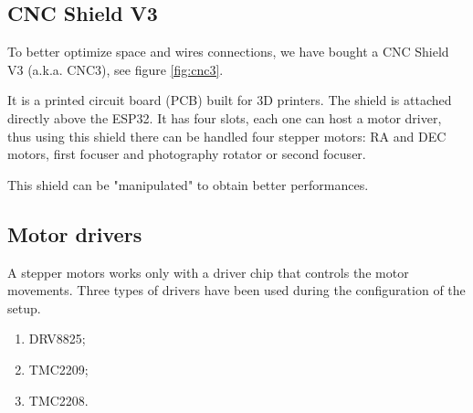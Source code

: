 
\subsection{CNC Shield V3}
To better optimize space and wires connections, we have bought a CNC Shield V3 (a.k.a. CNC3), see figure \ref{fig:cnc3}.

It is a printed circuit board (PCB) built for 3D printers.
The shield is attached directly above the ESP32.
It has four slots, each one can host a motor driver, thus using this shield there can be handled four stepper motors: RA and DEC motors, first focuser and photography rotator or second focuser.

This shield can be "manipulated" to obtain better performances.

\subsection{Motor drivers}
A stepper motors works only with a driver chip that controls the motor movements.
Three types of drivers have been used during the configuration of the setup.
\begin{enumerate}
    \item DRV8825;
    \item TMC2209;
    \item TMC2208.
\end{enumerate}

